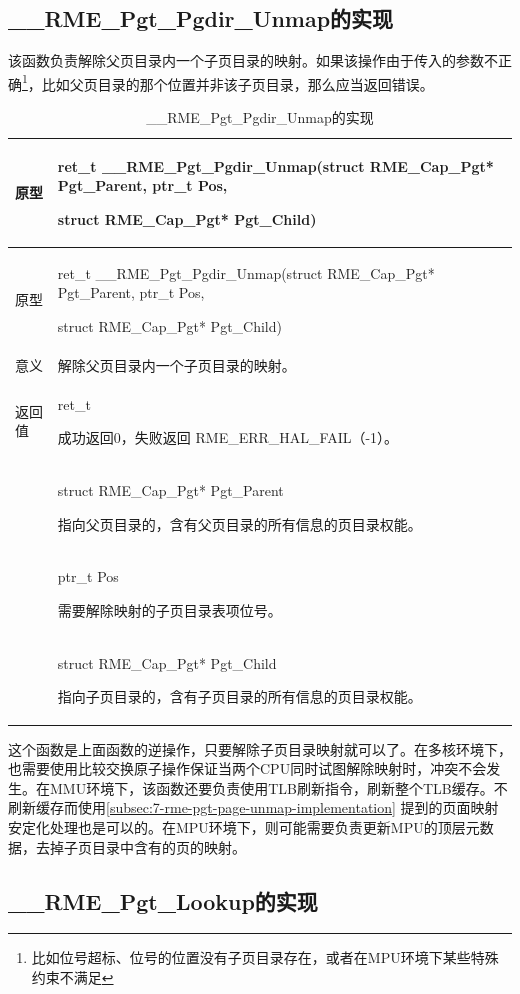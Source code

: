 \subsection{\_\_RME\_Pgt\_Pgdir\_Unmap的实现}\label{subsec:7-rme-pgt-pgdir-unmap-implementation}

该函数负责解除父页目录内一个子页目录的映射。如果该操作由于传入的参数不正确\footnote{比如位号超标、位号的位置没有子页目录存在，或者在MPU环境下某些特殊约束不满足}，比如父页目录的那个位置并非该子页目录，那么应当返回错误。

\begin{xltabular}{\textwidth}{@{}>{\hsize\raggedright\arraybackslash}X>{\hsize\raggedright\arraybackslash}X@{}}
\caption{\_\_RME\_Pgt\_Pgdir\_Unmap的实现}\label{tab:7-82-rme-pgt-pgdir-unmap-implementation}\\
\toprule
原型\strut
 & ret\_t \_\_RME\_Pgt\_Pgdir\_Unmap(struct RME\_Cap\_Pgt* Pgt\_Parent,
ptr\_t Pos,

struct RME\_Cap\_Pgt* Pgt\_Child)\strut
\tabularnewline
\endfirsthead
\toprule
原型\strut
 & ret\_t \_\_RME\_Pgt\_Pgdir\_Unmap(struct RME\_Cap\_Pgt* Pgt\_Parent,
ptr\_t Pos,

struct RME\_Cap\_Pgt* Pgt\_Child)\strut
\tabularnewline
\midrule
\endhead
\bottomrule
\endlastfoot
意义 & 解除父页目录内一个子页目录的映射。\tabularnewline
返回值\strut
 & ret\_t

成功返回0，失败返回 RME\_ERR\_HAL\_FAIL（-1）。\strut
\tabularnewline
{} & struct RME\_Cap\_Pgt* Pgt\_Parent

指向父页目录的，含有父页目录的所有信息的页目录权能。\strut
\tabularnewline
\strut
 & ptr\_t Pos

需要解除映射的子页目录表项位号。\strut
\tabularnewline
\strut
 & struct RME\_Cap\_Pgt* Pgt\_Child

指向子页目录的，含有子页目录的所有信息的页目录权能。\strut
\tabularnewline
\end{xltabular}

这个函数是上面函数的逆操作，只要解除子页目录映射就可以了。在多核环境下，也需要使用比较交换原子操作保证当两个CPU同时试图解除映射时，冲突不会发生。在MMU环境下，该函数还要负责使用TLB刷新指令，刷新整个TLB缓存。不刷新缓存而使用\ref{subsec:7-rme-pgt-page-unmap-implementation}
提到的页面映射安定化处理也是可以的。在MPU环境下，则可能需要负责更新MPU的顶层元数据，去掉子页目录中含有的页的映射。

\subsection{\_\_RME\_Pgt\_Lookup的实现}\label{subsec:7-rme-pgt-lookup-implementation}


